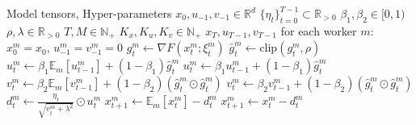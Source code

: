\documentclass{article}
\begin{document}
\begin{algorithm}[h]
\caption{DES-LOC-Adam}
\label{alg:desloc_adam}
\begin{algorithmic}[1]
\REQUIRE Model tensors, Hyper-parameters
\STATE $x_0, u_{-1}, v_{-1} \in \mathbb{R}^d$ 
\STATE $\{\eta_t\}_{t=0}^{T-1} \subset \mathbb{R}_{>0}$ 
\STATE $\beta_1, \beta_2 \in [0,1)$ 
\STATE $\rho, \lambda \in \mathbb{R}_{>0}$ 
\STATE $T, M \in \mathbb{N}_+$ 
\STATE $K_x, K_u, K_v \in \mathbb{N}_+$ 
\ENSURE $x_T, u_{T-1}, v_{T-1}$
\STATE for each worker $m$: $x^m_0 = x_0$, $u^m_{-1} = v^m_{-1} = 0$ 
 
        \STATE $g^m_t \gets \nabla F(x^m_t; \xi^m_t)$ 
        \STATE $\hat{g}^m_t \gets \text{clip}(g^m_t, \rho)$ 
         
            \STATE $u^m_t \gets \beta_1 \mathbb{E}_m[u^m_{t-1}] + (1 - \beta_1)\hat{g}^m_t$
        \ELSE
            \STATE $u^m_t \gets \beta_1 u^m_{t-1} + (1 - \beta_1)\hat{g}^m_t$
        \ENDIF
         
            \STATE $v^m_t \gets \beta_2 \mathbb{E}_m[v^m_{t-1}] + (1 - \beta_2)(\hat{g}^m_t \odot \hat{g}^m_t)$
        \ELSE
            \STATE $v^m_t \gets \beta_2 v^m_{t-1} + (1 - \beta_2)(\hat{g}^m_t \odot \hat{g}^m_t)$
        \ENDIF
        \STATE $d^m_t \gets \frac{\eta_t}{\sqrt{v^m_t + \lambda^2}} \odot u^m_t$ 
         
            \STATE $x^m_{t+1} \gets \mathbb{E}_m[x^m_t] - d^m_t$
        \ELSE
            \STATE $x^m_{t+1} \gets x^m_t - d^m_t$
        \ENDIF
    \ENDFOR
\ENDFOR
\end{algorithmic}
\end{algorithm}
\end{document}
